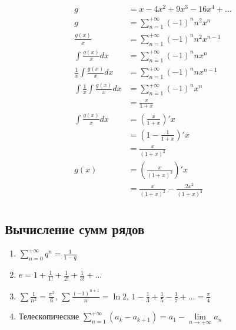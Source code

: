 \begin{exercise}
    \begin{align*}
        g                                       & = x - 4x^2 + 9x^3 - 16x^4 + \dots               \\
        g                                       & = \sum_{n = 1}^{+\infty} ( - 1)^n n^2 x^n       \\
        \frac{g(x)}{x}                          & = \sum_{n = 1}^{+\infty} ( - 1)^n n^2 x^{n - 1} \\
        \int \frac{g(x)}{x} dx                  & = \sum_{n = 1}^{+\infty} ( - 1)^n n x^n         \\
        \frac{1}{x} \int \frac{g(x)}{x} dx      & = \sum_{n = 1}^{+\infty} ( - 1)^n n x^{n - 1}   \\
        \int \frac{1}{x} \int \frac{g(x)}{x} dx & = \sum_{n = 1}^{+\infty} ( - 1)^n x^n           \\
                                                & = \frac{x}{1 + x}                               \\
        \int \frac{g(x)}{x} dx                  & = \left( \frac{x}{1 + x} \right)' x             \\
                                                & = \left( 1 - \frac{1}{1 + x} \right)' x         \\
                                                & = \frac{x}{(1 + x)^2}                           \\
        g(x)                                    & = \left( \frac{x}{(1 + x)^2} \right)' x         \\
                                                & = \frac{x}{(1 + x)^2} - \frac{2x^2}{(1 + x)^3}  \\
    \end{align*}
\end{exercise}

\subsection*{Вычисление сумм рядов}

\begin{enumerate}
    \item \(\sum_{n = 0}^{ +\infty} q^n = \frac{1}{1 - q}\)
    \item \(e = 1 + \frac{1}{1!} + \frac{1}{2!} + \frac{1}{3!} + \dots \)
    \item \(\sum \frac{1}{n^2} = \frac{\pi^2}{6}\), \(\sum \frac{( - 1)^{n + 1}}{n} = \ln 2\), \(1 - \frac{1}{3} + \frac{1}{5} - \frac{1}{7} + \dots = \frac{\pi}{4}\)
    \item Телескопические \(\sum\limits_{n = 1}^{ +\infty} (a_k - a_{k + 1}) = a_1 - \lim\limits_{n\to +\infty} a_n\)
\end{enumerate}

